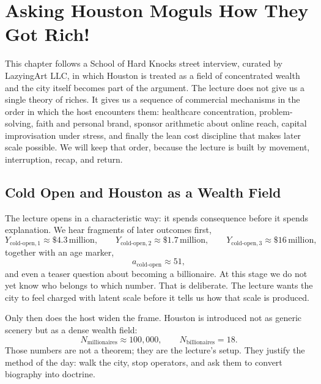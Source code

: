\chapter{Asking Houston Moguls How They Got Rich!}

This chapter follows a School of Hard Knocks street interview, curated by LazyingArt LLC, in which Houston is treated as a field of concentrated wealth and the city itself becomes part of the argument. The lecture does not give us a single theory of riches. It gives us a sequence of commercial mechanisms in the order in which the host encounters them: healthcare concentration, problem-solving, faith and personal brand, sponsor arithmetic about online reach, capital improvisation under stress, and finally the lean cost discipline that makes later scale possible. We will keep that order, because the lecture is built by movement, interruption, recap, and return.

\section{Cold Open and Houston as a Wealth Field}

The lecture opens in a characteristic way: it spends consequence before it spends explanation. We hear fragments of later outcomes first,
\begin{equation}
Y_{\text{cold-open},1} \approx \$4.3\,\text{million},\qquad
Y_{\text{cold-open},2} \approx \$1.7\,\text{million},\qquad
Y_{\text{cold-open},3} \approx \$16\,\text{million},
\end{equation}
together with an age marker,
\begin{equation}
a_{\text{cold-open}} \approx 51,
\end{equation}
and even a teaser question about becoming a billionaire. At this stage we do not yet know who belongs to which number. That is deliberate. The lecture wants the city to feel charged with latent scale before it tells us how that scale is produced.

Only then does the host widen the frame. Houston is introduced not as generic scenery but as a dense wealth field:
\begin{equation}
N_{\text{millionaires}} \approx 100{,}000,\qquad
N_{\text{billionaires}} = 18.
\end{equation}
Those numbers are not a theorem; they are the lecture's setup. They justify the method of the day: walk the city, stop operators, and ask them to convert biography into doctrine.

